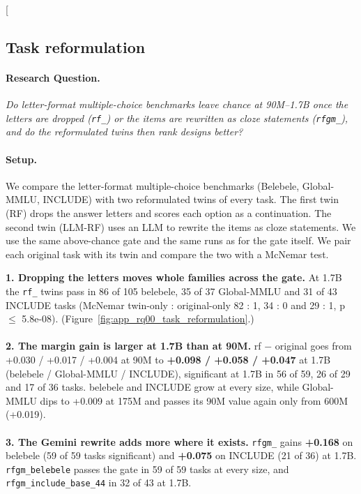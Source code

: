 \clearpage
\twocolumn[{%
\subsection{Task reformulation}
\label{app:rq00_task_reformulation}

\noindent\begin{minipage}[t]{0.485\textwidth}
\vspace{0pt}
\paragraph{Research Question.} \emph{Do letter-format multiple-choice benchmarks leave chance at 90M--1.7B once the letters are dropped (\texttt{rf\_}) or the items are rewritten as cloze statements (\texttt{rfgm\_}), and do the reformulated twins then rank designs better?}

\paragraph{Setup.} We compare the letter-format multiple-choice benchmarks (Belebele, Global-MMLU, INCLUDE) with two reformulated twins of every task. The first twin (RF) drops the answer letters and scores each option as a continuation. The second twin (LLM-RF) uses an LLM to rewrite the items as cloze statements. We use the same above-chance gate and the same runs as for the gate itself. We pair each original task with its twin and compare the two with a McNemar test.
\end{minipage}\hfill
\begin{minipage}[t]{0.485\textwidth}
\vspace{0pt}
\begin{rqfinding}
\textbf{1. Dropping the letters moves whole families across the gate.} At 1.7B the \texttt{rf\_} twins pass in 86 of 105 belebele, 35 of 37 Global-MMLU and 31 of 43 INCLUDE tasks (McNemar twin-only : original-only 82 : 1, 34 : 0 and 29 : 1, p $\leq$ 5.8e-08). (Figure~\ref{fig:app_rq00_task_reformulation}.)
\\
\\
\textbf{2. The margin gain is larger at 1.7B than at 90M.} rf $-$ original goes from +0.030 / +0.017 / +0.004 at 90M to \textbf{+0.098 / +0.058 / +0.047} at 1.7B (belebele / Global-MMLU / INCLUDE), significant at 1.7B in 56 of 59, 26 of 29 and 17 of 36 tasks. belebele and INCLUDE grow at every size, while Global-MMLU dips to +0.009 at 175M and passes its 90M value again only from 600M (+0.019).
\\
\\
\textbf{3. The Gemini rewrite adds more where it exists.} \texttt{rfgm\_} gains \textbf{+0.168} on belebele (59 of 59 tasks significant) and \textbf{+0.075} on INCLUDE (21 of 36) at 1.7B. \texttt{rfgm\_belebele} passes the gate in 59 of 59 tasks at every size, and \texttt{rfgm\_include\_base\_44} in 32 of 43 at 1.7B.
\end{rqfinding}
\end{minipage}

}

